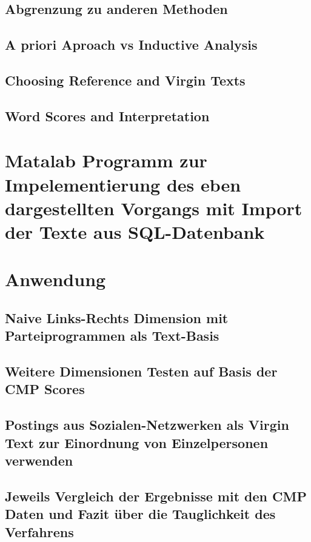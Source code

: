  

  \subsection{Abgrenzung zu anderen Methoden}
  \subsection{A priori Aproach vs Inductive Analysis}
  \subsection{Choosing Reference and Virgin Texts}
  \subsection{Word Scores and Interpretation}
  
\section{Matalab Programm zur Impelementierung des eben dargestellten Vorgangs mit Import der Texte aus SQL-Datenbank}

\section{Anwendung}
    \subsection{Naive Links-Rechts Dimension mit Parteiprogrammen als Text-Basis}
    \subsection{Weitere Dimensionen Testen auf Basis der CMP Scores}
    \subsection{Postings aus Sozialen-Netzwerken als Virgin Text zur Einordnung von Einzelpersonen verwenden}
    \subsection{Jeweils Vergleich der Ergebnisse mit den CMP Daten und Fazit über die Tauglichkeit des Verfahrens}

